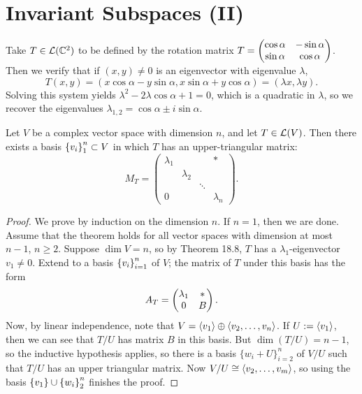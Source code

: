 \documentclass{article}
\begin{document}
\section{Invariant Subspaces (II)}
\begin{example}
Take $T\in\mathcal L(\mathbb C^2)$ to be defined by the rotation matrix $T = \begin{pmatrix}\cos \alpha & -\sin\alpha \\ \sin \alpha & \cos \alpha \end{pmatrix}$. Then we verify that if $(x,y) \neq 0$ is an eigenvector with eigenvalue $\lambda$,
$$T(x,y) = (x\cos \alpha-y\sin\alpha, x\sin \alpha + y\cos\alpha) = (\lambda x, \lambda y).$$
Solving this system yields $\lambda^2-2\lambda \cos \alpha + 1=0$, which is a quadratic in $\lambda$, so we recover the eigenvalues $\lambda_{1,2} = \cos\alpha \pm i\sin \alpha$.
\end{example}
\newpage
\begin{theorem}
Let $V$ be a complex vector space with dimension $n$, and let $T\in\mathcal L(V)$. Then there exists a basis $\left\{v_i\right\}_1^n\subset V$ in which $T$ has an upper-triangular matrix:
$$M_T = \begin{pmatrix}
\lambda_1 & & & *  \\
& \lambda_2  \\
& & \ddots & \\
0 & & & \lambda_n
\end{pmatrix}.$$
\begin{proof}
We prove by induction on the dimension $n$. If $n=1$, then we are done. Assume that the theorem holds for all vector spaces with dimension at most $n-1$, $n\geq 2$. Suppose $\dim V = n$, so by Theorem 18.8, $T$ has a $\lambda_1$-eigenvector $v_1\neq 0$. Extend to a basis $\left\{v_i\right\}_{i=1}^n$ of $V$; the matrix of $T$ under this basis has the form
$$A_T = \begin{matfour}{\lambda_1}*0B\end{matfour}.$$
Now, by linear independence, note that $V = \left\langle v_1\right\rangle \oplus \left\langle v_2, \ldots, v_n\right\rangle$. If $U := \left\langle v_1\right\rangle$, then we can see that $T/U$ has matrix $B$ in this basis. But $\dim(T/U) = n-1$, so the inductive hypothesis applies, so there is a basis $\{w_i+U\}_{i=2}^n$ of $V/U$ such that $T/U$ has an upper triangular matrix. Now $V/U\cong \left\langle v_2, \ldots, v_m\right\rangle$, so using the basis $\left\{v_1\right\} \cup \left\{w_i\right\}_2^n$ finishes the proof.
\end{proof}
\end{theorem}
\end{document}
